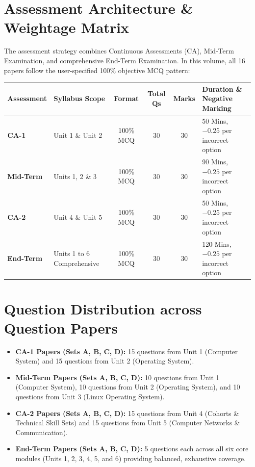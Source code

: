 \section*{Assessment Architecture \& Weightage Matrix}

The assessment strategy combines Continuous Assessments (CA), Mid-Term Examination, and comprehensive End-Term Examination. In this volume, all 16 papers follow the user-specified 100\% objective MCQ pattern:

\begin{center}
\small
\begin{tabularx}{\textwidth}{|l|l|c|c|c|X|}
\hline
\textbf{Assessment} & \textbf{Syllabus Scope} & \textbf{Format} & \textbf{Total Qs} & \textbf{Marks} & \textbf{Duration \& Negative Marking} \\
\hline
\textbf{CA-1} & Unit 1 \& Unit 2 & 100\% MCQ & 30 & 30 & 50 Mins, $-0.25$ per incorrect option \\
\hline
\textbf{Mid-Term} & Units 1, 2 \& 3 & 100\% MCQ & 30 & 30 & 90 Mins, $-0.25$ per incorrect option \\
\hline
\textbf{CA-2} & Unit 4 \& Unit 5 & 100\% MCQ & 30 & 30 & 50 Mins, $-0.25$ per incorrect option \\
\hline
\textbf{End-Term} & Units 1 to 6 Comprehensive & 100\% MCQ & 30 & 30 & 120 Mins, $-0.25$ per incorrect option \\
\hline
\end{tabularx}
\end{center}

\vspace{3mm}

\section*{Question Distribution across Question Papers}

\begin{itemize}[leftmargin=8mm]
    \item \textbf{CA-1 Papers (Sets A, B, C, D):} 15 questions from Unit 1 (Computer System) and 15 questions from Unit 2 (Operating System).
    \item \textbf{Mid-Term Papers (Sets A, B, C, D):} 10 questions from Unit 1 (Computer System), 10 questions from Unit 2 (Operating System), and 10 questions from Unit 3 (Linux Operating System).
    \item \textbf{CA-2 Papers (Sets A, B, C, D):} 15 questions from Unit 4 (Cohorts \& Technical Skill Sets) and 15 questions from Unit 5 (Computer Networks \& Communication).
    \item \textbf{End-Term Papers (Sets A, B, C, D):} 5 questions each across all six core modules (Units 1, 2, 3, 4, 5, and 6) providing balanced, exhaustive coverage.
\end{itemize}

\newpage
